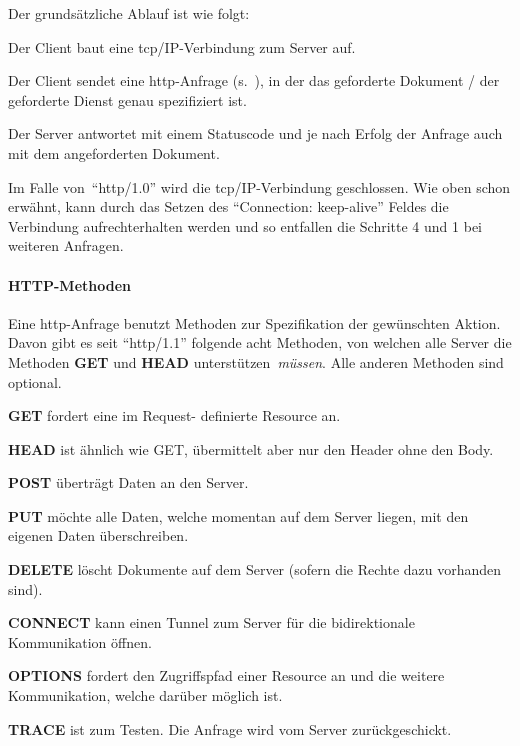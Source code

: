 		Der grundsätzliche Ablauf ist wie folgt:
		\begin{compactenum}
			\item Der Client baut eine \gls{tcp}/IP-Verbindung zum Server auf.
			\item Der Client sendet eine \gls{http}-Anfrage (s.~),
			in der das geforderte Dokument / der geforderte Dienst genau spezifiziert ist.
			\item Der Server antwortet mit einem Statuscode und je nach Erfolg der Anfrage auch mit dem angeforderten Dokument.
			\item Im Falle von~\enquote{\gls{http}/1.0} wird die \gls{tcp}/IP-Verbindung geschlossen.
			Wie oben schon erwähnt, kann durch das Setzen des \enquote{Connection: keep-alive} Feldes
			die Verbindung aufrechterhalten werden und so entfallen die Schritte 4 und 1 bei weiteren Anfragen.
		\end{compactenum}

		\paragraph{HTTP-Methoden}\label{p:httpMethoden}
			Eine \gls{http}-Anfrage benutzt Methoden zur Spezifikation der gewünschten Aktion.
			Davon gibt es seit \enquote{\gls{http}/1.1} folgende acht Methoden,
			von welchen alle Server die Methoden \textbf{GET} und \textbf{HEAD} unterstützen~\textit{müssen}.
			Alle anderen Methoden sind optional.
			\begin{compactitem}
				\item \textbf{GET} fordert eine im Request- definierte Resource an.
				\item \textbf{HEAD} ist ähnlich wie GET, übermittelt aber nur den Header ohne den Body.
				\item \textbf{POST} überträgt Daten an den Server.
				\item \textbf{PUT} möchte alle Daten, welche momentan auf dem Server liegen,
				mit den eigenen Daten überschreiben.
				\item \textbf{DELETE} löscht Dokumente auf dem Server (sofern die Rechte dazu vorhanden sind).
				\item \textbf{CONNECT} kann einen Tunnel zum Server für die bidirektionale Kommunikation öffnen.
				\item \textbf{OPTIONS} fordert den Zugriffspfad einer Resource an und die weitere Kommunikation,
				welche darüber möglich ist.
				\item \textbf{TRACE} ist zum Testen.
				Die Anfrage wird vom Server zurückgeschickt.
			\end{compactitem}

